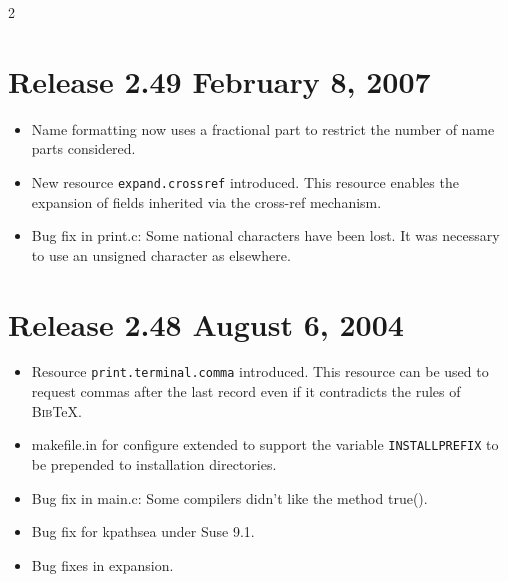 \documentclass[11pt,a4paper]{scrartcl}
\newcommand\rsc[1]{\texttt{#1}}
\newcommand\File[1]{\textsf{#1}}
\newcommand\BibTeX{\textsc{Bib}\TeX}
\newenvironment{Releases}{\begin{multicols}2\RaggedRight}{\end{multicols}}
\newenvironment{Release}[2]{%
  \def\tmp{#2}%
  \section*{Release #1 \ifx\tmp\empty\else{\normalsize[#2]}\fi}
  \begin{itemize}
}{\end{itemize}}
\newenvironment{Fix}[1]{\item }{}
\newenvironment{New}[1]{\item }{}
\begin{document}
\begin{Releases}
\begin{Release}{2.49}{February 8, 2007}
  \begin{New}{gene}
    Name formatting now uses a fractional part to restrict the number
    of name parts considered.
  \end{New}

  \begin{New}{gene}
    New resource \rsc{expand.crossref} introduced. This resource
    enables the expansion of fields inherited via the cross-ref
    mechanism.
  \end{New}
  \begin{Fix}{gene}
    Bug fix in \File{print.c}: Some national characters have been lost.
    It was necessary to use an unsigned character as elsewhere.
  \end{Fix}
 \end{Release}

 \begin{Release}{2.48}{August 6, 2004}
  \begin{New}{gene}
    Resource \rsc{print.terminal.comma} introduced. This resource can
    be used to request commas after the last record even if it
    contradicts the rules of \BibTeX.
  \end{New}
  \begin{New}{gene}
    \File{makefile.in} for configure extended to support the variable
    \texttt{INSTALLPREFIX} to be prepended to installation
    directories.
  \end{New}
  \begin{Fix}{gene}
    Bug fix in \File{main.c}: Some compilers didn't like the method
    true().
  \end{Fix}
  \begin{Fix}{gene}
    Bug fix for kpathsea under Suse 9.1.
  \end{Fix}
  \begin{Fix}{gene}
    Bug fixes in expansion.
  \end{Fix}


\end{Release}
\end{Releases}
\end{document}
